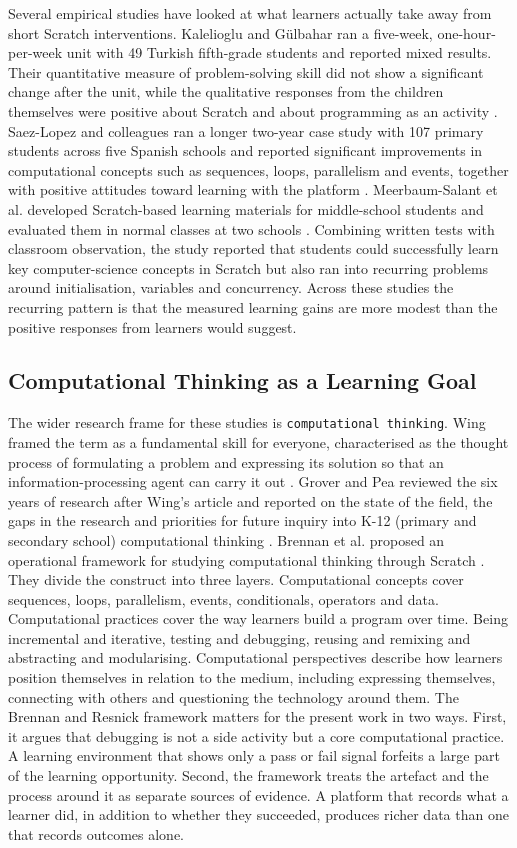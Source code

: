 Several empirical studies have looked at what learners actually take away from short Scratch interventions. 
Kalelioglu and Gülbahar ran a five-week, one-hour-per-week unit
with 49 Turkish fifth-grade students and reported mixed results.
Their quantitative measure of problem-solving skill did not show a significant change after the unit, while the 
qualitative responses from the children
themselves were positive about Scratch and about programming as an activity \cite{kalelioglu2014}.
Saez-Lopez and colleagues ran a longer two-year case study with 107 primary students across five Spanish schools and 
reported
significant improvements in computational concepts such as sequences, loops, parallelism and events, together with
positive attitudes toward learning with the platform \cite{saezLopez2016}. Meerbaum-Salant et al. developed 
Scratch-based learning materials
for middle-school students and evaluated them in normal classes at two schools \cite{meerbaum2013}.
Combining written tests with classroom observation, the study reported that students could successfully learn key 
computer-science concepts in Scratch but also
ran into recurring problems around initialisation, variables and concurrency.
Across these studies the recurring pattern is that the measured learning gains are more modest than the positive responses 
from learners would suggest.

\subsection{Computational Thinking as a Learning Goal}
The wider research frame for these studies is \texttt{computational thinking}. Wing framed the term as a fundamental
skill for everyone, characterised as the thought process of formulating a problem and expressing its solution so that an
information-processing agent can carry it out \cite{wing2006}. Grover and Pea reviewed
the six years of research after Wing's article and reported on the state of the field, the gaps in the research and
priorities for future inquiry into K-12 (primary and secondary school) computational thinking \cite{grover2013}.
Brennan et al. proposed an operational framework for studying computational thinking through Scratch \cite{brennan2012}.
They divide the construct into three layers. Computational concepts cover sequences, loops, parallelism, events, conditionals, operators
and data. Computational practices cover the way learners build a program over time. Being incremental and iterative, testing and debugging, reusing and
remixing and abstracting and modularising.
Computational perspectives describe how learners position themselves in relation to the medium, including expressing themselves, connecting with others
and questioning the technology around them.
The Brennan and Resnick framework matters for the present work in two ways. First,
it argues that debugging is not a side activity but a core computational practice.
A learning environment that shows only a pass or fail signal forfeits a large part of the learning opportunity.
Second, the framework treats the artefact and the process around it as separate sources of evidence.
A platform that records what a learner did, in addition to whether they succeeded, produces richer data than one that
records outcomes alone.


